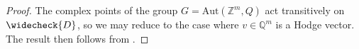 \documentclass[letter, 11pt]{article}
\theoremstyle{plain}
\newtheorem{proposition}[subsubsection]{Proposition}
\theoremstyle{definition}
\newcommand{\IC}{\mathbb{C}}
\newcommand{\ID}{\mathbb{D}}
\newcommand{\IQ}{\mathbb{Q}}
\newcommand{\IR}{\mathbb{R}}
\newcommand{\IV}{\mathbb{V}}
\newcommand{\IZ}{\mathbb{Z}}
\newcommand{\sK}{\mathcal{K}}
\newcommand{\che}[1]{\widecheck{#1}}
\newcommand{\<}{\langle}
\renewcommand{\>}{\rangle}
\newcommand{\sI}{\mathcal{I}}
\newcommand{\sS}{\mathcal{S}}
\newcommand{\sP}{\mathcal{P}}
\newcommand{\GL}{\mathrm{GL}}
\newcommand\restr[2]{{
	\left.\kern-\nulldelimiterspace
	#1
	\vphantom{\big|}
	\right|_{#2}
	}}
\begin{document}
\begin{proof}
The complex points of the group $G = \textrm{Aut}(\IZ^{m}, Q)$ act transitively on $\che{D}$, so we may reduce to the case where $v \in \IQ^{m}$ is a Hodge vector. The result then follows from \cite[Prop 5.4]{Carlson2009}.
\end{proof}





\end{document}
